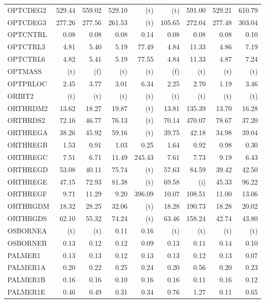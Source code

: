 \documentclass[11pt,twoside]{article}
\begin{document}
{\begin{longtable}[c]{|l|r|r|r|r|r|r|r|r|}
OPTCDEG2 & 529.44 & 559.02 & 529.10 & (t) & (t) & 591.00 & 529.21 & 610.79 \\
OPTCDEG3 & 277.26 & 277.56 & 261.53 & (t) & 105.65 & 272.04 & 277.48 & 303.04 \\
OPTCNTRL & 0.08 & 0.08 & 0.08 & 0.14 & 0.08 & 0.08 & 0.08 & 0.10 \\
OPTCTRL3 & 4.81 & 5.40 & 5.19 & 77.49 & 4.84 & 11.33 & 4.86 & 7.19 \\
OPTCTRL6 & 4.82 & 5.41 & 5.19 & 77.55 & 4.84 & 11.33 & 4.87 & 7.24 \\
OPTMASS & (t) & (f) & (t) & (t) & (f) & (t) & (t) & (t) \\
OPTPRLOC & 2.45 & 3.77 & 3.01 & 6.34 & 2.25 & 2.70 & 1.19 & 3.46 \\
ORBIT2 & (t) & (t) & (t) & (t) & (t) & (t) & (t) & (t) \\
ORTHRDM2 & 13.62 & 18.27 & 19.87 & (t) & 13.81 & 135.39 & 13.70 & 16.28 \\
ORTHRDS2 & 72.16 & 46.77 & 76.13 & (t) & 70.14 & 470.07 & 78.67 & 37.20 \\
ORTHREGA & 38.26 & 45.92 & 59.16 & (t) & 39.75 & 42.18 & 34.98 & 39.04 \\
ORTHREGB & 1.53 & 0.91 & 1.03 & 0.25 & 1.64 & 0.92 & 0.98 & 0.30 \\
ORTHREGC & 7.51 & 6.71 & 11.49 & 245.43 & 7.61 & 7.73 & 9.19 & 6.43 \\
ORTHREGD & 53.08 & 40.11 & 75.74 & (t) & 57.63 & 84.59 & 39.42 & 42.50 \\
ORTHREGE & 47.15 & 72.93 & 81.38 & (t) & 69.58 & (i) & 45.33 & 96.22 \\
ORTHREGF & 9.71 & 11.29 & 9.20 & 396.09 & 10.07 & 108.51 & 11.00 & 13.06 \\
ORTHRGDM & 18.32 & 28.25 & 32.06 & (t) & 18.28 & 190.73 & 18.28 & 20.02 \\
ORTHRGDS & 62.10 & 55.32 & 74.24 & (t) & 63.46 & 158.24 & 42.74 & 43.80 \\
OSBORNEA & (t) & (t) & 0.11 & 0.16 & (t) & (t) & (t) & (t) \\
OSBORNEB & 0.13 & 0.12 & 0.12 & 0.09 & 0.13 & 0.11 & 0.14 & 0.10 \\
PALMER1 & 0.13 & 0.13 & 0.12 & 0.13 & 0.13 & 0.12 & 0.13 & 0.07 \\
PALMER1A & 0.20 & 0.22 & 0.25 & 0.24 & 0.20 & 0.56 & 0.20 & 0.23 \\
PALMER1B & 0.16 & 0.16 & 0.10 & 0.16 & 0.16 & 0.11 & 0.16 & 0.12 \\
PALMER1E & 0.46 & 0.49 & 0.31 & 0.34 & 0.76 & 1.27 & 0.11 & 0.65 \\

\end{longtable}}
\end{document}
